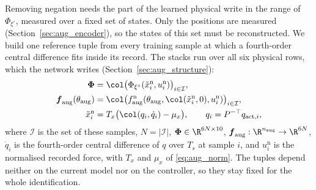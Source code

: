 Removing negation needs the part of the learned physical write in the range
of $\Phi_{\xi^\circ}$, measured over a fixed set of states.
Only the positions are measured (Section~\ref{sec:aug_encoder}), so the states
of this set must be reconstructed.
We build one reference tuple from every training sample at which a
fourth-order central difference fits inside its record.
The stacks run over all six physical rows, which the network writes
(Section~\ref{sec:aug_structure}):
{\small
\begin{equation}
\begin{aligned}
 \boldsymbol\Phi&=\col\bigl(\Phi_{\xi^\circ}(\tilde x^{\mathrm n}_i,
   u^{\mathrm n}_i)\bigr)_{i\in\mathcal I},\\
 \boldsymbol f_{\mathrm{aug}}(\theta_{\mathrm{aug}})&=\col\bigl(
   f^{\mathrm n}_{\mathrm{aug}}(\theta_{\mathrm{aug}},
   \col(\tilde x^{\mathrm n}_i,0),u^{\mathrm n}_i)\bigr)_{i\in\mathcal I},\\
 \tilde x^{\mathrm n}_i&=T_x\bigl(\col(q_i,\dot q_i)-\mu_x\bigr),\qquad
 q_i=P^{-\top}q_{\mathrm{act},i},
\end{aligned}
\label{eq:obc_stacks}
\end{equation}
}
where $\mathcal I$ is the set of these samples, $N=|\mathcal I|$,
$\boldsymbol\Phi\in\R^{6N\times10}$,
$\boldsymbol f_{\mathrm{aug}}:\R^{n_{\mathrm{aug}}}\to\R^{6N}$, $\dot q_i$ is
the fourth-order central difference of $q$ over $T_s$ at sample $i$, and
$u^{\mathrm n}_i$ is the normalised recorded force, with $T_x$ and $\mu_x$ of
\eqref{eq:aug_norm}.
The tuples depend neither on the current model nor on the controller, so they
stay fixed for the whole identification.


